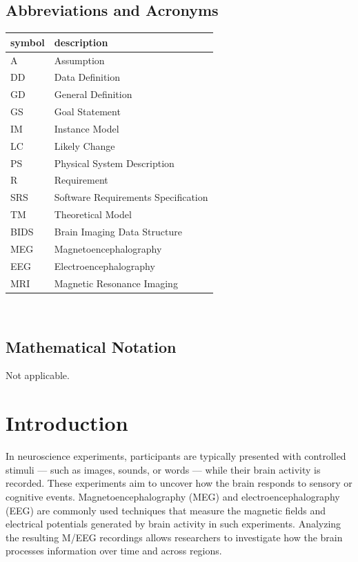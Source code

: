 \documentclass[12pt]{article}
\begin{document}
\subsection{Abbreviations and Acronyms}


\renewcommand{\arraystretch}{1.2}
\begin{tabular}{l l} 
    \toprule		
    \textbf{symbol} & \textbf{description}\\
    \midrule 
        A & Assumption\\
        DD & Data Definition\\
        GD & General Definition\\
        GS & Goal Statement\\
        IM & Instance Model\\
        LC & Likely Change\\
        PS & Physical System Description\\
        R & Requirement\\
        SRS & Software Requirements Specification\\
        TM & Theoretical Model\\
        BIDS & Brain Imaging Data Structure\\
        MEG & Magnetoencephalography\\
        EEG & Electroencephalography\\
        MRI & Magnetic Resonance Imaging\\
    \bottomrule
\end{tabular}\\




\subsection{Mathematical Notation}
Not applicable.

\newpage








\section{Introduction}


In neuroscience experiments, participants are typically presented with controlled stimuli --- such as images, sounds, or words --- while their brain activity is recorded. These experiments aim to uncover how the brain responds to sensory or cognitive events. Magnetoencephalography (MEG) and electroencephalography (EEG) are commonly used techniques that measure the magnetic fields and electrical potentials generated by brain activity in such experiments. Analyzing the resulting M/EEG recordings allows researchers to investigate how the brain processes information over time and across regions.
\end{document}
